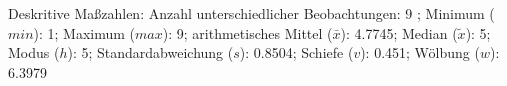 				\label{tableValues:bsch15b}
				\vspace*{-\baselineskip}
                    \begin{noten}
                	    \note{} Deskritive Maßzahlen:
                	    Anzahl unterschiedlicher Beobachtungen: 9%
                	    ; 
                	      Minimum ($min$): 1; 
                	      Maximum ($max$): 9; 
                	      arithmetisches Mittel ($\bar{x}$): \num[round-mode=places,round-precision=2]{4,7745}; 
                	      Median ($\tilde{x}$): 5; 
                	      Modus ($h$): 5; 
                	      Standardabweichung ($s$): \num[round-mode=places,round-precision=2]{0,8504}; 
                	      Schiefe ($v$): \num[round-mode=places,round-precision=2]{0,451}; 
                	      Wölbung ($w$): \num[round-mode=places,round-precision=2]{6,3979}
                     \end{noten}


